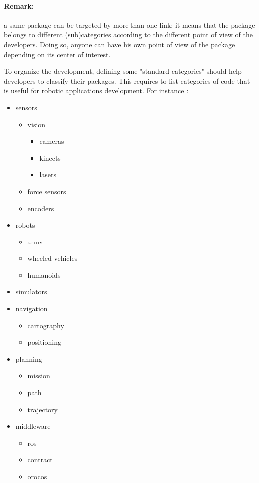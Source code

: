 \documentclass[12pt,a4paper]{article}
\begin{document}
\paragraph*{Remark:} 
a same package can be targeted by more than one link: it means that the package belongs to different (sub)categories according to the different point of view of the developers. Doing so, anyone can have his own point of view of the package depending on its center of interest.
\linebreak

To organize the development, defining some "standard categories" should help developers to classify their packages. This requires to list categories of code that is useful for robotic applications development. For instance :
\begin{itemize}
\item sensors
\begin{itemize}
\item vision
\begin{itemize}
\item cameras
\item kinects
\item lasers
\end{itemize}
\item force sensors
\item encoders
\end{itemize}
\item robots
\begin{itemize}
\item arms
\item wheeled vehicles
\item humanoids
\end{itemize}
\item simulators
\item navigation
\begin{itemize}
\item cartography
\item positioning
\end{itemize}
\item planning
\begin{itemize}
\item mission
\item path
\item trajectory
\end{itemize}
\item middleware
\begin{itemize}
\item ros
\item contract
\item orocos
\end{itemize}
\end{itemize}
\end{document}
